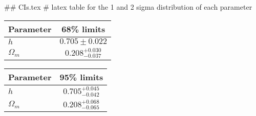## CIs.tex
# latex table for the 1 and 2 sigma distribution of each parameter

\begin{tabular} { l  c}
 Parameter &  68\% limits\\
\hline
{\boldmath$h              $} & $0.705\pm 0.022            $\\
{\boldmath$\Omega_m       $} & $0.208^{+0.030}_{-0.037}   $\\
\hline
\end{tabular}

\begin{tabular} { l  c}
 Parameter &  95\% limits\\
\hline
{\boldmath$h              $} & $0.705^{+0.045}_{-0.042}   $\\
{\boldmath$\Omega_m       $} & $0.208^{+0.068}_{-0.065}   $\\
\hline
\end{tabular}
